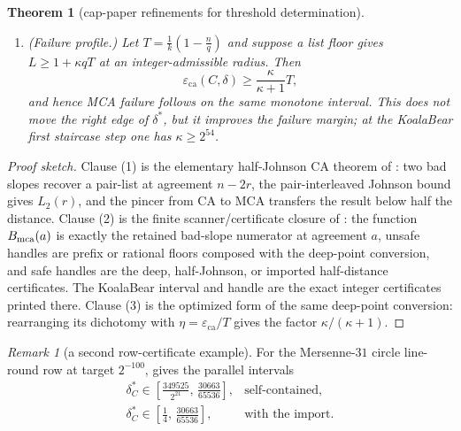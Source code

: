 \documentclass[11pt]{amsart}
\newtheorem{theorem}{Theorem}[section]
\theoremstyle{definition}
\theoremstyle{remark}
\newtheorem{remark}[remark]{Remark}
\newcommand{\eca}{\varepsilon_{\mathrm{ca}}}
\begin{document}
\begin{theorem}[cap-paper refinements for threshold determination]
\begin{enumerate}
\[\begin{array}{ll}
        &\text{self-contained,}\\[2mm]
        \delta^*_C(2^{-128})\in
        \left[\frac14,\,\frac{15331}{32768}\right],
        &\text{with the imported half-distance theorem.}
\end{array}
\]
The optimized unsafe handle behind the KoalaBear upper edge is
\[
        (c,m,w,\Delta)=(16,69748,4211,67392),
        \qquad
        1-\frac{mc}{n}
        =
        1-\frac{16\cdot69748}{2^{21}}
        =
        \frac{15331}{32768}.
\]
Here $\Delta$ is the checked surplus in the cap-paper certificate.
The same certificate grammar applies to map-smooth, circle, and genus-one/rational-smooth rows after the transports proved in \cite{Cho26b}.
\item \textup{(Failure profile.)} Let $T=\frac1k(1-\frac nq)$ and suppose a list floor gives $L\ge1+\kappa qT$ at an integer-admissible radius.  Then
\[
        \eca(C,\delta)\ge\frac{\kappa}{\kappa+1}T,
\]
and hence MCA failure follows on the same monotone interval.  This does not move the right edge of $\delta^*$, but it improves the failure margin; at the KoalaBear first staircase step one has $\kappa\ge2^{54}$.
\end{enumerate}
\end{theorem}

\begin{proof}[Proof sketch]
Clause \textup{(1)} is the elementary half-Johnson CA theorem of \cite{Cho26b}: two bad slopes recover a pair-list at agreement $n-2r$, the pair-interleaved Johnson bound gives $L_2(r)$, and the pincer from CA to MCA transfers the result below half the distance. Clause \textup{(2)} is the finite scanner/certificate closure of \cite{Cho26b}: the function $B_{\rm mca}(a)$ is exactly the retained bad-slope numerator at agreement $a$, unsafe handles are prefix or rational floors composed with the deep-point conversion, and safe handles are the deep, half-Johnson, or imported half-distance certificates. The KoalaBear interval and handle are the exact integer certificates printed there. Clause \textup{(3)} is the optimized form of the same deep-point conversion: rearranging its dichotomy with $\eta=\eca/T$ gives the factor $\kappa/(\kappa+1)$.
\end{proof}

\begin{remark}[a second row-certificate example]\label{rem:circle-certificate}
For the Mersenne-$31$ circle line-round row at target $2^{-100}$, \cite{Cho26b} gives the parallel intervals
\[
\begin{array}{ll}
        \delta^*_C\in
        \left[\frac{349525}{2^{21}},\,\frac{30663}{65536}\right],
        &\text{self-contained,}\\[2mm]
        \delta^*_C\in
        \left[\frac14,\,\frac{30663}{65536}\right],
        &\text{with the import.}
\end{array}
\]
\end{remark}
\end{document}
